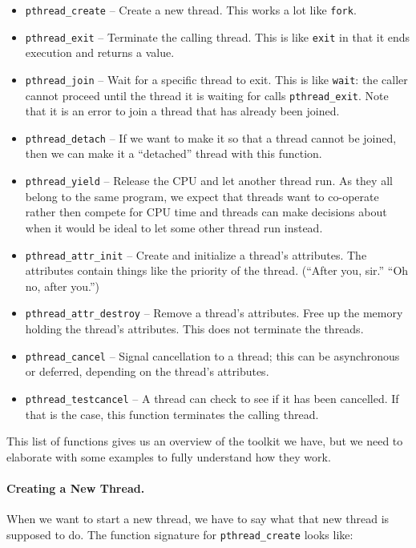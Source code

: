 \documentclass[a4paper]{report}
\begin{document}
\begin{itemize}
	\item \texttt{pthread\_create} -- Create a new thread. This works a lot like \texttt{fork}.
	\item \texttt{pthread\_exit} -- Terminate the calling thread. This is like \texttt{exit} in that it ends execution and returns a value.
	\item \texttt{pthread\_join} -- Wait for a specific thread to exit. This is like \texttt{wait}: the caller cannot proceed until the thread it is waiting for calls \texttt{pthread\_exit}. Note that it is an error to join a thread that has already been joined.
	\item \texttt{pthread\_detach} -- If we want to make it so that a thread cannot be joined, then we can make it a ``detached'' thread with this function.
	\item \texttt{pthread\_yield} -- Release the CPU and let another thread run. As they all belong to the same program, we expect that threads want to co-operate rather then compete for CPU time and threads can make decisions about when it would be ideal to let some other thread run instead.
	\item \texttt{pthread\_attr\_init} -- Create and initialize a thread's attributes. The attributes contain things like the priority of the thread. (``After you, sir.'' ``Oh no, after you.'')
	\item \texttt{pthread\_attr\_destroy} -- Remove a thread's attributes. Free up the memory holding the thread's attributes. This does not terminate the threads.
	\item \texttt{pthread\_cancel} -- Signal cancellation to a thread; this can be asynchronous or deferred, depending on the thread's attributes.
	\item \texttt{pthread\_testcancel} -- A thread can check to see if it has been cancelled. If that is the case, this function terminates the calling thread.
\end{itemize}

This list of functions gives us an overview of the toolkit we have, but we need to elaborate with some examples to fully understand how they work.

\paragraph{Creating a New Thread.}

When we want to start a new thread, we have to say what that new thread is supposed to do. The function signature for \texttt{pthread\_create} looks like:
\end{document}

